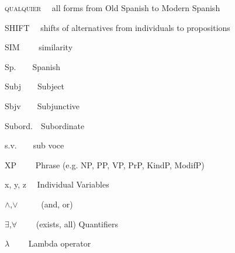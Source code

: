 \begin{styleStandard}
\textsc{qualquier \ \ }all forms from Old Spanish to Modern Spanish 
\end{styleStandard}

\begin{styleStandard}
SHIFT \ \ shifts of alternatives from individuals to propositions
\end{styleStandard}

\begin{styleStandard}
SIM \ \ \ \ similarity
\end{styleStandard}

\begin{styleStandard}
Sp.\ \ \ \ Spanish
\end{styleStandard}

\begin{styleStandard}
Subj\ \ \ \ Subject
\end{styleStandard}

\begin{styleStandard}
Sbjv\ \ \ \ Subjunctive
\end{styleStandard}

\begin{styleStandard}
Subord.\ \ Subordinate
\end{styleStandard}

\begin{styleStandard}
s.v.\ \ \ \ sub voce
\end{styleStandard}

\begin{styleStandard}
XP \ \ \ \ Phrase (e.g. NP, PP, VP, PrP, KindP, ModifP)
\end{styleStandard}

\begin{styleStandard}
x, y, z \ \ Individual Variables 
\end{styleStandard}

\begin{styleStandard}
${\wedge}$,${\vee}$ \ \ \ \ \ (and, or) 
\end{styleStandard}

\begin{styleStandard}
${\exists}$,${\forall}$ \ \ \ \ (exists, all) Quantifiers
\end{styleStandard}

\begin{styleStandard}
$\lambda $ \ \ \ \ Lambda operator
\end{styleStandard}

